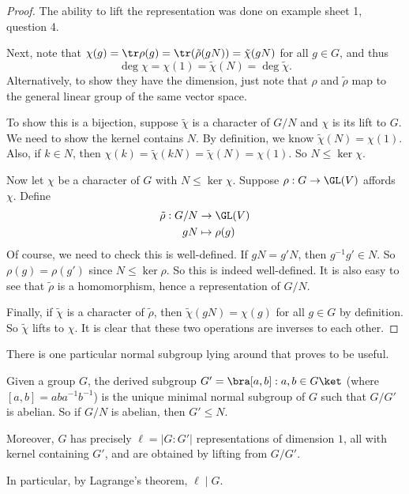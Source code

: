 \documentclass[a4paper]{article}
\begin{document}
\begin{proof}
  The ability to lift the representation was done on example sheet 1, question 4. %

  Next, note that $\chi(g) = \tr \rho(g) = \tr (\tilde{\rho}(gN)) = \tilde{\chi}(gN)$ for all $g \in G$, and thus
  \[
    \deg \chi = \chi(1) = \tilde{\chi}(N) = \deg \tilde{\chi}.
  \]
  Alternatively, to show they have the dimension, just note that $\rho$ and $\tilde{\rho}$ map to the general linear group of the same vector space.

  To show this is a bijection, suppose $\tilde{\chi}$ is a character of $G/N$ and $\chi$ is its lift to $G$. We need to show the kernel contains $N$. By definition, we know $\tilde{\chi}(N) = \chi(1)$. Also, if $k \in N$, then $\chi(k) = \tilde{\chi}(kN) = \tilde{\chi}(N) = \chi(1)$. So $N \leq \ker \chi$.

  Now let $\chi$ be a character of $G$ with $N \leq \ker \chi$. Suppose $\rho: G \to \GL(V)$ affords $\chi$. Define
  \begin{align*}
    \tilde{\rho}: G/N &\to \GL(V)\\
    gN &\mapsto \rho(g)
  \end{align*}
  Of course, we need to check this is well-defined. If $gN = g'N$, then $g^{-1} g' \in N$. So $\rho(g) = \rho(g')$ since $N \leq \ker \rho$. So this is indeed well-defined. It is also easy to see that $\tilde{\rho}$ is a homomorphism, hence a representation of $G/N$.

  Finally, if $\tilde{\chi}$ is a character of $\tilde{\rho}$, then $\tilde{\chi}(gN) = \chi(g)$ for all $g \in G$ by definition. So $\tilde{\chi}$ lifts to $\chi$. It is clear that these two operations are inverses to each other.
\end{proof}
There is one particular normal subgroup lying around that proves to be useful.

\begin{lemma}
  Given a group $G$, the derived subgroup $G' = \bra [a, b]: a, b \in G\ket$ (where $[a, b] = aba^{-1}b^{-1}$) is the unique minimal normal subgroup of $G$ such that $G/G'$ is abelian. So if $G/N$ is abelian, then $G' \leq N$.

  Moreover, $G$ has precisely $\ell = |G:G'|$ representations of dimension $1$, all with kernel containing $G'$, and are obtained by lifting from $G/G'$.

  In particular, by Lagrange's theorem, $\ell \mid G$.
\end{lemma}
\end{document}
